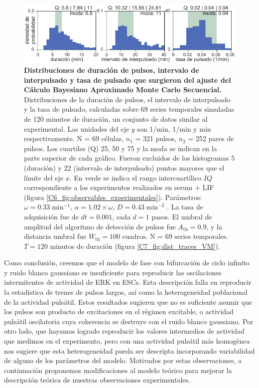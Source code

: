 \documentclass[./main.tex]{subfiles}
\begin{document}
\begin{figure}
    \centering
    \includegraphics[width=1\columnwidth]{figures/chapter6/C6_param_evaluation_hist.pdf} 
    \caption{\textbf{Distribuciones de duración de pulsos, intervalo de interpulsado y tasa de pulsado que surgieron del ajuste del Cálculo Bayesiano Aproximado Monte Carlo Secuencial.} Distribuciones de la duración de pulsos, el intervalo de interpulsado y la tasa de pulsado, calculadas sobre 69 series temporales simuladas de 120 minutos de duración, un conjunto de datos similar al experimental. Las unidades del eje $y$ son 1/min, 1/min y min respectivamente. N = 69 células, $n_1$ = 321 pulsos, $n_2$ = 252 pares de pulsos. Los cuartiles (Q) 25, 50 y 75 y la moda se indican en la parte superior de cada gráfico. Fueron excluidos de los histogramas 5 (duración) y 22 (intervalo de interpulsado) puntos mayores que el límite del eje $x$. En verde se indica el rango intercuartílico $IQ$ correspondiente a los experimentos realizados en serum + LIF (figura \ref{C6_fig:observables_experimentales}). Parámetros: $\omega = 0.33 \;\text{min}^{-1}$, $\alpha = 1.02 \times \omega$, $ D = 0.43 \; \text{min}^{-2}$ . La tasa de adquisición fue de $dt = 0.001$, cada $d = 1$ pasos. El umbral de amplitud del algoritmo de detección de pulsos fue $A_{\text{th}} = 0.9$, y la distancia umbral fue $W_{\text{th}} = 100\text{ cuadros}$. N = $69$ series temporales. $T = 120$ minutos de duración (figura \ref{C7_fig:dist_traces_VM}).}
    \label{C6_fig:dist_param_evaluation_hist}
\end{figure} 



Como conclusión, creemos que el modelo de fase con bifurcación de ciclo infinito y ruido blanco gaussiano es insuficiente para reproducir las oscilaciones intermitentes de actividad de ERK en ESCs. Esta descripción falla en reproducir la estadística de trenes de pulsos largos, así como la heterogeneidad poblacional de la actividad pulsátil. Estos resultados sugieren que no es suficiente asumir que los pulsos son producto de excitaciones en el régimen excitable, o actividad pulsátil oscilatoria cuya coherencia se destruye con el ruido blanco gaussiano. Por otro lado, que hayamos logrado reproducir los valores intermedios de actividad que medimos en el experimento, pero con una actividad pulsátil más homogénea nos sugiere que esta heterogeneidad pueda ser descripta incorporando variabilidad de alguno de los parámetros del modelo. Motivados por estas observaciones, a continuación proponemos modificaciones al modelo teórico para mejorar la descripción teórica de nuestras observaciones experimentales. 
\end{document}
